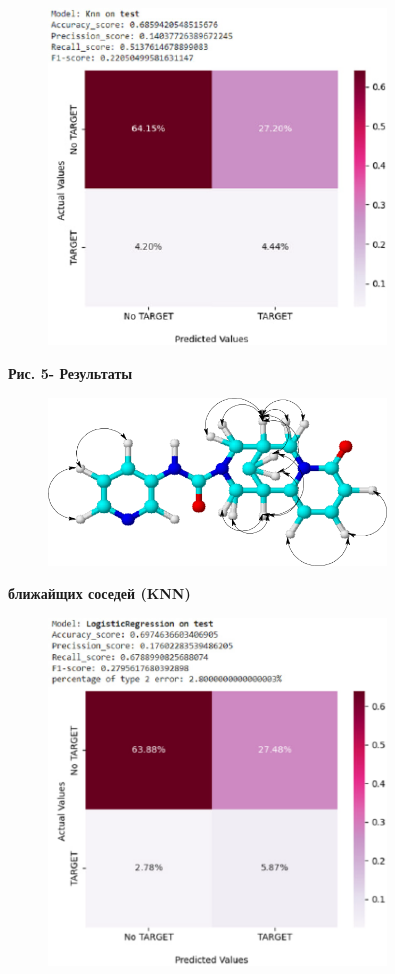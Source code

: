 \begin{figure}[H]
	\centering
	\includegraphics[width=0.8\textwidth]{assets/42}
	\caption*{}
\end{figure}

{\bfseries Рис. 5- Результаты}
\begin{figure}[H]
	\centering
	\includegraphics[width=0.8\textwidth]{assets/11}
	\caption*{}
\end{figure}{\bfseries ближайщих соседей (KNN)}

\begin{figure}[H]
	\centering
	\includegraphics[width=0.8\textwidth]{assets/43}
	\caption*{}
\end{figure}

